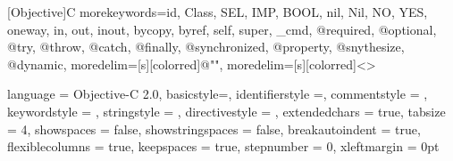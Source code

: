 [Objective]{C} {
    morekeywords={id, Class, SEL, IMP, BOOL, nil, Nil, NO, YES,
                  oneway, in, out, inout, bycopy, byref,
                  self, super, _cmd,
                  @required, @optional,
                  @try, @throw, @catch, @finally,
                  @synchronized, @property, @snythesize, @dynamic},
    moredelim=[s][color{red}]{@"}{"},
    moredelim=[s][color{red}]{<}{>}
}

 {
    language        = Objective-C 2.0,
    basicstyle=\footnotesize,
    identifierstyle =\color{black},
    commentstyle    = \color{green},
    keywordstyle    = \color{pink},
    stringstyle     = \color{red},
    directivestyle  = \color{brown},
    extendedchars   = true,
    tabsize         = 4,
    showspaces      = false,
    showstringspaces = false,
    breakautoindent = true,
    flexiblecolumns = true,
    keepspaces      = true,
    stepnumber      = 0,
    xleftmargin     = 0pt
 }


